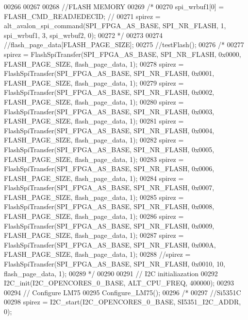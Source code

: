 \begin{DoxyCode}
00266 
00267 
00268     \textcolor{comment}{//FLASH MEMORY}
00269     \textcolor{comment}{/*}
00270 \textcolor{comment}{    spi\_wrbuf1[0] = FLASH\_CMD\_READJEDECID;  //}
00271 \textcolor{comment}{    spirez = alt\_avalon\_spi\_command(SPI\_FPGA\_AS\_BASE, SPI\_NR\_FLASH, 1, spi\_wrbuf1, 3, spi\_wrbuf2, 0);}
00272 \textcolor{comment}{    */}
00273 
00274     \textcolor{comment}{//flash\_page\_data[FLASH\_PAGE\_SIZE];}
00275     \textcolor{comment}{//testFlash();}
00276     \textcolor{comment}{/*}
00277 \textcolor{comment}{    spirez = FlashSpiTransfer(SPI\_FPGA\_AS\_BASE, SPI\_NR\_FLASH, 0x0000, FLASH\_PAGE\_SIZE, flash\_page\_data, 1);}
00278 \textcolor{comment}{    spirez = FlashSpiTransfer(SPI\_FPGA\_AS\_BASE, SPI\_NR\_FLASH, 0x0001, FLASH\_PAGE\_SIZE, flash\_page\_data, 1);}
00279 \textcolor{comment}{    spirez = FlashSpiTransfer(SPI\_FPGA\_AS\_BASE, SPI\_NR\_FLASH, 0x0002, FLASH\_PAGE\_SIZE, flash\_page\_data, 1);}
00280 \textcolor{comment}{    spirez = FlashSpiTransfer(SPI\_FPGA\_AS\_BASE, SPI\_NR\_FLASH, 0x0003, FLASH\_PAGE\_SIZE, flash\_page\_data, 1);}
00281 \textcolor{comment}{    spirez = FlashSpiTransfer(SPI\_FPGA\_AS\_BASE, SPI\_NR\_FLASH, 0x0004, FLASH\_PAGE\_SIZE, flash\_page\_data, 1);}
00282 \textcolor{comment}{    spirez = FlashSpiTransfer(SPI\_FPGA\_AS\_BASE, SPI\_NR\_FLASH, 0x0005, FLASH\_PAGE\_SIZE, flash\_page\_data, 1);}
00283 \textcolor{comment}{    spirez = FlashSpiTransfer(SPI\_FPGA\_AS\_BASE, SPI\_NR\_FLASH, 0x0006, FLASH\_PAGE\_SIZE, flash\_page\_data, 1);}
00284 \textcolor{comment}{    spirez = FlashSpiTransfer(SPI\_FPGA\_AS\_BASE, SPI\_NR\_FLASH, 0x0007, FLASH\_PAGE\_SIZE, flash\_page\_data, 1);}
00285 \textcolor{comment}{    spirez = FlashSpiTransfer(SPI\_FPGA\_AS\_BASE, SPI\_NR\_FLASH, 0x0008, FLASH\_PAGE\_SIZE, flash\_page\_data, 1);}
00286 \textcolor{comment}{    spirez = FlashSpiTransfer(SPI\_FPGA\_AS\_BASE, SPI\_NR\_FLASH, 0x0009, FLASH\_PAGE\_SIZE, flash\_page\_data, 1);}
00287 \textcolor{comment}{    spirez = FlashSpiTransfer(SPI\_FPGA\_AS\_BASE, SPI\_NR\_FLASH, 0x000A, FLASH\_PAGE\_SIZE, flash\_page\_data, 1);}
00288 \textcolor{comment}{    //spirez = FlashSpiTransfer(SPI\_FPGA\_AS\_BASE, SPI\_NR\_FLASH, 0x0010, 10, flash\_page\_data, 1);}
00289 \textcolor{comment}{    */}
00290 
00291     \textcolor{comment}{// I2C initialiazation}
00292     I2C_init(I2C_OPENCORES_0_BASE, ALT_CPU_FREQ, 400000);
00293 
00294     \textcolor{comment}{// Configure LM75}
00295     Configure_LM75();
00296 \textcolor{comment}{/*}
00297 \textcolor{comment}{    //Si5351C}
00298 \textcolor{comment}{    spirez = I2C\_start(I2C\_OPENCORES\_0\_BASE, SI5351\_I2C\_ADDR, 0);}

\end{DoxyCode}
